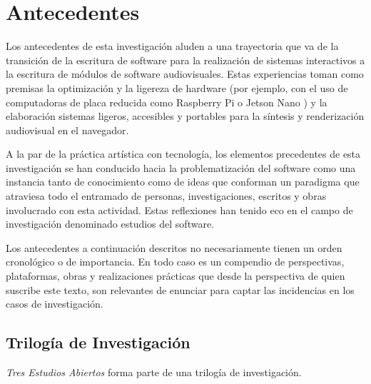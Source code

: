 \chapter{Antecedentes}



Los antecedentes de esta investigación aluden a una trayectoria que va de la transición de la escritura de software para la realización de sistemas interactivos a la escritura de módulos de software audiovisuales. Estas experiencias toman como premisas la optimización y la ligereza de hardware (por ejemplo, con el uso de computadoras de placa reducida como Raspberry Pi o Jetson Nano ) y la elaboración sistemas ligeros, accesibles y portables para la síntesis y renderización audiovisual en el navegador.

A la par de la práctica artística con tecnología, los elementos precedentes de esta investigación se han conducido hacia la problematización del software como una instancia tanto de conocimiento como de ideas que conforman un paradigma que atraviesa todo el entramado de personas, investigaciones, escritos y obras involucrado con esta actividad. Estas reflexiones han tenido eco en el campo de investigación denominado estudios del software.

Los antecedentes a continuación descritos no necesariamente tienen un orden cronológico o de importancia. En todo caso es un compendio de perspectivas, plataformas, obras y realizaciones prácticas que desde la perspectiva de quien suscribe este texto, son relevantes de enunciar para captar las incidencias en los casos de investigación. 

\section{Trilogía de Investigación}

\textit{Tres Estudios Abiertos} forma parte de una trilogía de investigación. 

